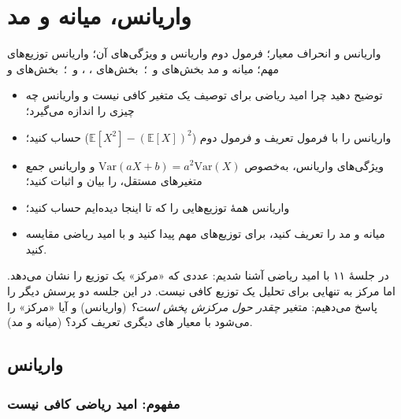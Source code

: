 \chapter{واریانس، میانه و مد}
\label{ch:s12}

{واریانس و انحراف معیار؛ فرمول دوم واریانس و ویژگی‌های آن؛ واریانس توزیع‌های مهم؛ میانه و مد}
{ بخش‌های  و  \,؛\,  بخش‌های ، ،  و  \,؛\,  بخش‌های  و }
{\begin{itemize}
    \item توضیح دهید چرا امید ریاضی برای توصیف یک متغیر کافی نیست و واریانس چه چیزی را اندازه می‌گیرد؛
    \item واریانس را با فرمول تعریف و فرمول دوم ($\mathbb E[X^2]-(\mathbb E[X])^2$) حساب کنید؛
    \item ویژگی‌های واریانس، به‌خصوص $\mathrm{Var}(aX+b)=a^2\mathrm{Var}(X)$ و واریانس جمع متغیرهای مستقل، را بیان و اثبات کنید؛
    \item واریانس همهٔ توزیع‌هایی را که تا اینجا دیده‌ایم حساب کنید؛
    \item میانه و مد را تعریف کنید، برای توزیع‌های مهم پیدا کنید و با امید ریاضی مقایسه کنید.
  \end{itemize}}

در جلسهٔ ۱۱ با امید ریاضی آشنا شدیم: عددی که «مرکز» یک توزیع را نشان می‌دهد. اما مرکز به تنهایی برای تحلیل یک توزیع کافی نیست. در این جلسه دو پرسش دیگر را پاسخ می‌دهیم: متغیر \emph{چقدر حول مرکزش پخش است؟} (واریانس) و آیا «مرکز» را می‌شود با معیار های دیگری تعریف کرد؟ (میانه و مد).

\section{واریانس}
\label{sec:var}

\subsection{مفهوم: امید ریاضی کافی نیست}

